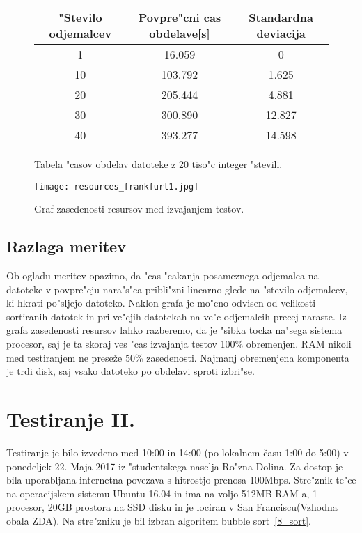 \begin{figure}[!htbp]
  \centering
  \begin{tabular}{ | c | c | c | }
    \hline
    "Stevilo odjemalcev & Povpre"cni cas obdelave[s] & Standardna deviacija\\ \hline
    1 & 16.059     & 0 \\ \hline
    10 & 103.792 & 1.625\\ \hline
    20 & 205.444 & 4.881\\ \hline
    30 & 300.890 & 12.827\\ \hline
    40 & 393.277 & 14.598\\ \hline
  \end{tabular}
  \caption{Tabela "casov obdelav datoteke z 20 tiso"c integer "stevili.}
  \label{8_table1}
  \centering
\end{figure}



\begin{figure}
  \centering
    \texttt{[image: resources\_frankfurt1.jpg]}
  \caption{Graf zasedenosti resursov med izvajanjem testov.}
  \label{8_test1_res}
\end{figure}

\subsection{Razlaga meritev}
Ob ogladu meritev opazimo, da "cas "cakanja posameznega odjemalca na datoteke v povpre"cju nara"s"ca pribli"zni linearno glede na "stevilo odjemalcev, ki hkrati po"sljejo datoteko.
Naklon grafa je mo"cno odvisen od velikosti sortiranih datotek in pri ve"cjih datotekah na ve"c odjemalcih precej naraste.
Iz grafa zasedenosti resursov lahko razberemo, da je "sibka tocka na"sega sistema procesor, saj je ta skoraj ves "cas izvajanja testov 100\% obremenjen. RAM nikoli med testiranjem ne preseže 50\% zasedenosti.
Najmanj obremenjena komponenta je trdi disk, saj vsako datoteko po obdelavi sproti izbri"se.

\section{Testiranje II. }
Testiranje je bilo izvedeno med 10:00 in 14:00 (po lokalnem času 1:00 do 5:00)  v ponedeljek 22. Maja 2017 iz "studentskega naselja Ro"zna Dolina. Za dostop je bila uporabljana internetna povezava s hitrostjo prenosa 100Mbps.
Stre"znik te"ce na operacijskem sistemu Ubuntu 16.04 in ima na voljo 512MB RAM-a, 1 procesor, 20GB prostora na SSD disku in je lociran v San Franciscu(Vzhodna obala ZDA). Na stre"zniku je bil izbran algoritem bubble sort~\ref{8_sort}.


